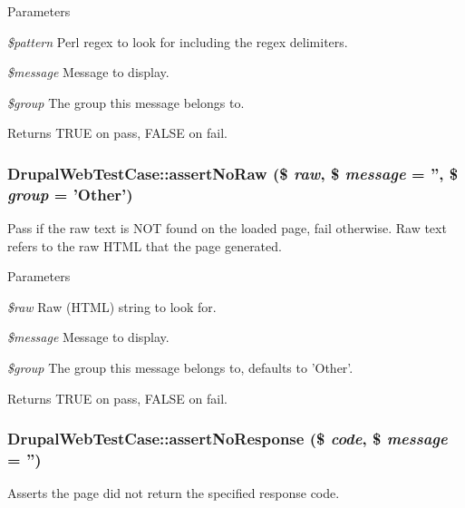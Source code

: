 \begin{DoxyParams}{Parameters}
\item[{\em \$pattern}]Perl regex to look for including the regex delimiters. \item[{\em \$message}]Message to display. \item[{\em \$group}]The group this message belongs to. \end{DoxyParams}
\begin{DoxyReturn}{Returns}
TRUE on pass, FALSE on fail. 
\end{DoxyReturn}
\hypertarget{classDrupalWebTestCase_ae683aebc33c05b0ba2e7e3f06f4485a9}{
\subsubsection[{assertNoRaw}]{\setlength{\rightskip}{0pt plus 5cm}DrupalWebTestCase::assertNoRaw (\$ {\em raw}, \/  \$ {\em message} = {\ttfamily ''}, \/  \$ {\em group} = {\ttfamily 'Other'})}}
\label{classDrupalWebTestCase_ae683aebc33c05b0ba2e7e3f06f4485a9}
Pass if the raw text is NOT found on the loaded page, fail otherwise. Raw text refers to the raw HTML that the page generated.


\begin{DoxyParams}{Parameters}
\item[{\em \$raw}]Raw (HTML) string to look for. \item[{\em \$message}]Message to display. \item[{\em \$group}]The group this message belongs to, defaults to 'Other'. \end{DoxyParams}
\begin{DoxyReturn}{Returns}
TRUE on pass, FALSE on fail. 
\end{DoxyReturn}
\hypertarget{classDrupalWebTestCase_a0e47bffd70302e2fc2998094e619bb5f}{
\subsubsection[{assertNoResponse}]{\setlength{\rightskip}{0pt plus 5cm}DrupalWebTestCase::assertNoResponse (\$ {\em code}, \/  \$ {\em message} = {\ttfamily ''})}}
\label{classDrupalWebTestCase_a0e47bffd70302e2fc2998094e619bb5f}
Asserts the page did not return the specified response code.


